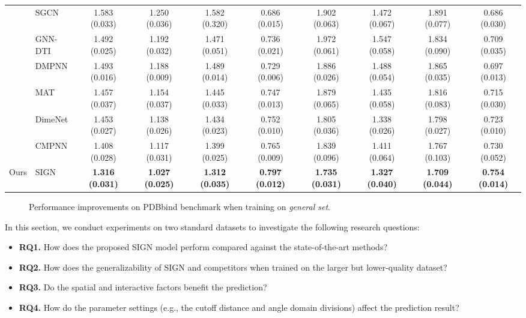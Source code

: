 \documentclass[sigconf]{acmart}
\newcommand{\B}[1]{{\bfseries #1}}
\newcommand{\model}{\textsf{SIGN}\xspace}
\begin{document}
\begin{table*}[t]
{\begin{tabular}{cl|cccc|cccc}
		& SGCN &1.583 (0.033)  &1.250 (0.036)  &1.582 (0.320)  &0.686 (0.015)  &1.902 (0.063)  &1.472 (0.067)  &1.891 (0.077)  &0.686 (0.030) \\  
		& GNN-DTI &1.492 (0.025)  &1.192 (0.032)  &1.471 (0.051)  &0.736 (0.021)  &1.972 (0.061)  &1.547 (0.058)  &1.834 (0.090)  &0.709 (0.035) \\
		& DMPNN &1.493 (0.016)  &1.188 (0.009)  &1.489 (0.014)  &0.729 (0.006)  &1.886 (0.026)  &1.488 (0.054)  &1.865 (0.035)  &0.697 (0.013) \\
		& MAT &1.457 (0.037)  &1.154 (0.037)  &1.445 (0.033)  &0.747 (0.013)  &1.879 (0.065)  &1.435 (0.058)  &1.816 (0.083)  &0.715 (0.030) \\
		& DimeNet &1.453 (0.027)  &1.138 (0.026)  &1.434 (0.023)  &0.752 (0.010)  &1.805 (0.036)  &1.338 (0.026)  &1.798 (0.027)  &0.723 (0.010) \\
		& CMPNN &1.408 (0.028)  &1.117 (0.031)  &1.399 (0.025)  &0.765 (0.009)  &1.839 (0.096)  &1.411 (0.064)  &1.767 (0.103)  &0.730 (0.052)
		\\ \midrule Ours & \model &\textbf{1.316 (0.031)}  &\textbf{1.027 (0.025)}  &\textbf{1.312 (0.035)}  &\textbf{0.797 (0.012)}  &\textbf{1.735 (0.031)}  &\textbf{1.327 (0.040)}  &\textbf{1.709 (0.044)}  &\textbf{0.754 (0.014)}
		\\ \bottomrule 

		
	\end{tabular}}
	\vspace{-4ex}
\end{table*} \begin{figure*}
\setlength{\abovecaptionskip}{2.mm}
\setlength{\belowcaptionskip}{-0.cm}
  \centering
  \vspace{-5mm}
  \caption{Performance improvements on PDBbind benchmark when training on \textit{general set}.}
  \vspace{-5mm}
  \label{fig-general} \end{figure*}
In this section, we conduct experiments on two standard datasets to investigate the following research questions:
\begin{itemize}[leftmargin=*,topsep=3pt]
\item \B{RQ1.} How does the proposed \model model perform compared against the state-of-the-art methods?
    \item \B{RQ2.} How does the generalizability of \model and competitors when trained on the larger but lower-quality dataset? 
\item \B{RQ3.} Do the spatial and interactive factors benefit the prediction?
    \item \B{RQ4.} How do the parameter settings (e.g., the cutoff distance and angle domain divisions) affect the prediction result?
\end{itemize}
\end{document}
